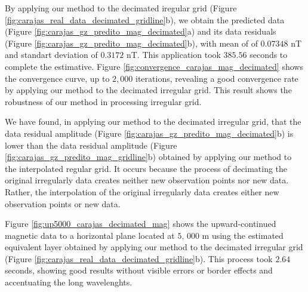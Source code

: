 By applying our method to the decimated iregular grid 
(Figure \ref{fig:carajas_real_data_decimated_gridline}b), we  obtain the  predicted data 
(Figure \ref{fig:carajas_gz_predito_mag_decimated}a) and its data residuals 
(Figure \ref{fig:carajas_gz_predito_mag_decimated}b), with mean of  of $0.07348$ nT and standart deviation of $0.3172$ nT. This application took $385.56$ seconds to complete the estimative.
Figure \ref{fig:convergence_carajas_mag_decimated} shows the convergence curve, up to $2,000$ iterations, revealing a good convergence rate by applying our method to the decimated irregular grid. 
This result shows the  robustness of our method in processing irregular grid.

We have found, in applying our method to the decimated irregular grid, that the data residual amplitude (Figure \ref{fig:carajas_gz_predito_mag_decimated}b) is lower than the data residual amplitude (Figure 
\ref{fig:carajas_gz_predito_mag_gridline}b) obtained by applying our method to the interpolated regular grid.
It occurs because  the  process of decimating the original irregularly data creates neither new observation points nor new data. Rather, the interpolation of the original irregularly data creates either new observation points or new data. 

Figure \ref{fig:up5000_carajas_decimated_mag} shows the upward-continued magnetic data  to a horizontal plane located at $5, \,000$ m using the estimated equivalent layer obtained by applying our method to the decimated irregular grid (Figure \ref{fig:carajas_real_data_decimated_gridline}b).
This process took $2.64$ seconds, showing good results without visible errors or border effects and accentuating the long wavelenghts.